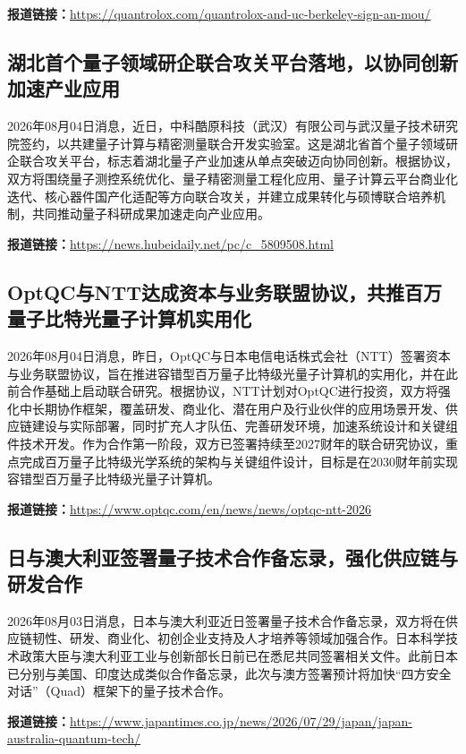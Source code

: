 \documentclass[12pt,a4paper]{ctexart}
\begin{document}
\noindent\textbf{报道链接：}\url{https://quantrolox.com/quantrolox-and-uc-berkeley-sign-an-mou/}

\subsection{ 湖北首个量子领域研企联合攻关平台落地，以协同创新加速产业应用 }

2026年08月04日消息，近日，中科酷原科技（武汉）有限公司与武汉量子技术研究院签约，以共建量子计算与精密测量联合开发实验室。这是湖北省首个量子领域研企联合攻关平台，标志着湖北量子产业加速从单点突破迈向协同创新。根据协议，双方将围绕量子测控系统优化、量子精密测量工程化应用、量子计算云平台商业化迭代、核心器件国产化适配等方向联合攻关，并建立成果转化与硕博联合培养机制，共同推动量子科研成果加速走向产业应用。

\noindent\textbf{报道链接：}\url{https://news.hubeidaily.net/pc/c\_5809508.html}

\subsection{ OptQC与NTT达成资本与业务联盟协议，共推百万量子比特光量子计算机实用化 }

2026年08月04日消息，昨日，OptQC与日本电信电话株式会社（NTT）签署资本与业务联盟协议，旨在推进容错型百万量子比特级光量子计算机的实用化，并在此前合作基础上启动联合研究。根据协议，NTT计划对OptQC进行投资，双方将强化中长期协作框架，覆盖研发、商业化、潜在用户及行业伙伴的应用场景开发、供应链建设与实际部署，同时扩充人才队伍、完善研发环境，加速系统设计和关键组件技术开发。作为合作第一阶段，双方已签署持续至2027财年的联合研究协议，重点完成百万量子比特级光学系统的架构与关键组件设计，目标是在2030财年前实现容错型百万量子比特级光量子计算机。

\noindent\textbf{报道链接：}\url{https://www.optqc.com/en/news/news/optqc-ntt-2026}

\subsection{ 日与澳大利亚签署量子技术合作备忘录，强化供应链与研发合作 }

2026年08月03日消息，日本与澳大利亚近日签署量子技术合作备忘录，双方将在供应链韧性、研发、商业化、初创企业支持及人才培养等领域加强合作。日本科学技术政策大臣与澳大利亚工业与创新部长日前已在悉尼共同签署相关文件。此前日本已分别与美国、印度达成类似合作备忘录，此次与澳方签署预计将加快“四方安全对话”（Quad）框架下的量子技术合作。

\noindent\textbf{报道链接：}\url{https://www.japantimes.co.jp/news/2026/07/29/japan/japan-australia-quantum-tech/}
\end{document}
